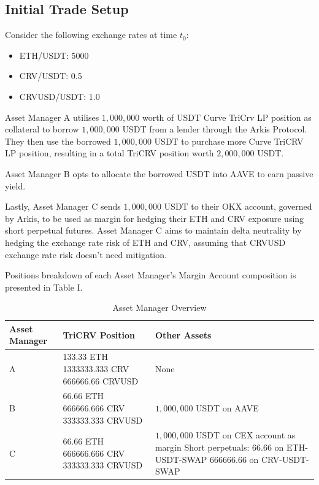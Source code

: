 \documentclass[conference]{IEEEtran}
\begin{document}
\subsection{Initial Trade Setup}
Consider the following exchange rates at time $t_{0}$:
\begin{itemize}
	\item ETH/USDT: 5000
	\item CRV/USDT: 0.5
	\item CRVUSD/USDT: 1.0
\end{itemize}

Asset Manager A utilises $1,000,000$ worth of USDT Curve TriCrv LP position as collateral to borrow $1,000,000$ USDT from a lender through the Arkis Protocol. They then use the borrowed $1,000,000$ USDT to purchase more Curve TriCRV LP position, resulting in a total TriCRV position worth $2,000,000$ USDT.

Asset Manager B opts to allocate the borrowed USDT into AAVE to earn passive yield. 

Lastly, Asset Manager C sends $1,000,000$ USDT to their OKX account, governed by Arkis, to be used as margin for hedging their ETH and CRV exposure using short perpetual futures. Asset Manager C aims to maintain delta neutrality by hedging the exchange rate risk of ETH and CRV, assuming that CRVUSD exchange rate risk doesn’t need mitigation.

Positions breakdown of each Asset Manager's Margin Account composition is presented in Table I.


\begin{table}[h]
\centering
\begin{tabular}{|p{1.5cm}|p{4.5cm}|p{8cm}|}
\hline
\textbf{Asset Manager} & \textbf{TriCRV Position} & \textbf{Other Assets} \\
\hline
A & 
\textbullet{} 133.33 ETH \newline
\textbullet{} 1333333.333 CRV \newline
\textbullet{} 666666.66 CRVUSD
& None \\
\hline
B & 
\textbullet{} 66.66 ETH \newline
\textbullet{} 666666.666 CRV \newline
\textbullet{} 333333.333 CRVUSD
& $1,000,000$ USDT on AAVE \\
\hline
C & 
\textbullet{} 66.66 ETH \newline
\textbullet{} 666666.666 CRV \newline
\textbullet{} 333333.333 CRVUSD
& \textbullet{} $1,000,000$ USDT on CEX account as margin \newline
\textbullet{} Short perpetuals: \newline
  \quad{} \textbullet{} 66.66 on ETH-USDT-SWAP \newline
  \quad{} \textbullet{} 666666.66 on CRV-USDT-SWAP \\
\hline
\end{tabular}
\caption{Asset Manager Overview}
\label{tab:asset-manager-overview}
\end{table}
\end{document}
